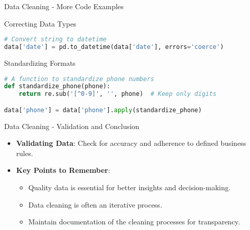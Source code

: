 \documentclass[aspectratio=169]{beamer}
\begin{document}
\begin{frame}[fragile]{Data Cleaning - More Code Examples}
    \begin{block}{Correcting Data Types}
        \begin{lstlisting}[language=Python]
# Convert string to datetime
data['date'] = pd.to_datetime(data['date'], errors='coerce')
        \end{lstlisting}
    \end{block}
    
    \begin{block}{Standardizing Formats}
        \begin{lstlisting}[language=Python]
# A function to standardize phone numbers
def standardize_phone(phone):
    return re.sub('[^0-9]', '', phone)  # Keep only digits

data['phone'] = data['phone'].apply(standardize_phone)
        \end{lstlisting}
    \end{block}
\end{frame}

\begin{frame}[fragile]{Data Cleaning - Validation and Conclusion}
    \begin{itemize}
        \item \textbf{Validating Data}: Check for accuracy and adherence to defined business rules.
        \item \textbf{Key Points to Remember}:
            \begin{itemize}
                \item Quality data is essential for better insights and decision-making.
                \item Data cleaning is often an iterative process.
                \item Maintain documentation of the cleaning processes for transparency.
            \end{itemize}
    \end{itemize}
\end{frame}
\end{document}
